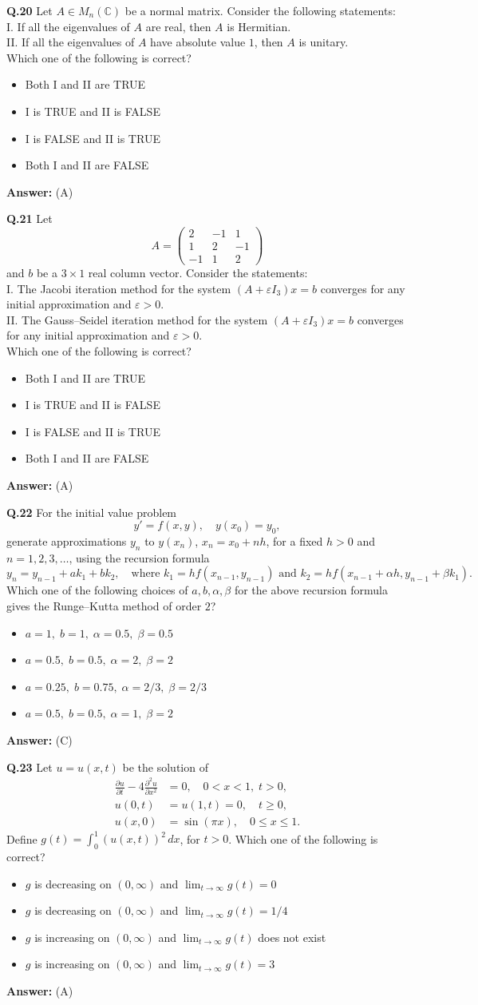 \documentclass[11pt,a4paper]{article}
\newcommand{\optslistA}[4]{%
  \begin{itemize}
    \setlength{\itemsep}{2pt}\setlength{\parskip}{0pt}
    \item[(A)] #1
    \item[(B)] #2
    \item[(C)] #3
    \item[(D)] #4
  \end{itemize}%
}
\newcommand{\ans}[1]{\textbf{Answer:} #1\par\medskip}
\begin{document}
\textbf{Q.20} Let $A \in M_n(\mathbb{C})$ be a normal matrix. Consider the following statements:\\
I. If all the eigenvalues of $A$ are real, then $A$ is Hermitian.\\
II. If all the eigenvalues of $A$ have absolute value $1$, then $A$ is unitary.\\
Which one of the following is correct?
\optslistA{Both I and II are TRUE}{I is TRUE and II is FALSE}{I is FALSE and II is TRUE}{Both I and II are FALSE}
\ans{(A)}

\textbf{Q.21} Let
\[
  A = \begin{pmatrix} 2 & -1 & 1 \\ 1 & 2 & -1 \\ -1 & 1 & 2 \end{pmatrix}
\]
and $b$ be a $3 \times 1$ real column vector. Consider the statements:\\
I. The Jacobi iteration method for the system $(A + \varepsilon I_3)x = b$ converges for any initial approximation and $\varepsilon > 0$.\\
II. The Gauss--Seidel iteration method for the system $(A + \varepsilon I_3)x = b$ converges for any initial approximation and $\varepsilon > 0$.\\
Which one of the following is correct?
\optslistA{Both I and II are TRUE}{I is TRUE and II is FALSE}{I is FALSE and II is TRUE}{Both I and II are FALSE}
\ans{(A)}

\textbf{Q.22} For the initial value problem
\[
  y' = f(x, y), \quad y(x_0) = y_0,
\]
generate approximations $y_n$ to $y(x_n)$, $x_n = x_0 + nh$, for a fixed $h > 0$ and $n = 1, 2, 3, \ldots$, using the recursion formula
\[
  y_n = y_{n-1} + a k_1 + b k_2, \quad \text{where } k_1 = h f(x_{n-1}, y_{n-1}) \text{ and } k_2 = h f(x_{n-1} + \alpha h, y_{n-1} + \beta k_1).
\]
Which one of the following choices of $a, b, \alpha, \beta$ for the above recursion formula gives the Runge--Kutta method of order $2$?
\optslistA{$a = 1, \; b = 1, \; \alpha = 0.5, \; \beta = 0.5$}{$a = 0.5, \; b = 0.5, \; \alpha = 2, \; \beta = 2$}{$a = 0.25, \; b = 0.75, \; \alpha = 2/3, \; \beta = 2/3$}{$a = 0.5, \; b = 0.5, \; \alpha = 1, \; \beta = 2$}
\ans{(C)}

\textbf{Q.23} Let $u = u(x, t)$ be the solution of
\begin{align*}
  \frac{\partial u}{\partial t} - 4 \frac{\partial^2 u}{\partial x^2} &= 0, \quad 0 < x < 1, \; t > 0, \\
  u(0, t) &= u(1, t) = 0, \quad t \ge 0, \\
  u(x, 0) &= \sin(\pi x), \quad 0 \le x \le 1.
\end{align*}
Define $g(t) = \int_0^1 (u(x, t))^2\,dx$, for $t > 0$. Which one of the following is correct?
\optslistA{$g$ is decreasing on $(0, \infty)$ and $\lim_{t \to \infty} g(t) = 0$}{$g$ is decreasing on $(0, \infty)$ and $\lim_{t \to \infty} g(t) = 1/4$}{$g$ is increasing on $(0, \infty)$ and $\lim_{t \to \infty} g(t)$ does not exist}{$g$ is increasing on $(0, \infty)$ and $\lim_{t \to \infty} g(t) = 3$}
\ans{(A)}
\end{document}
